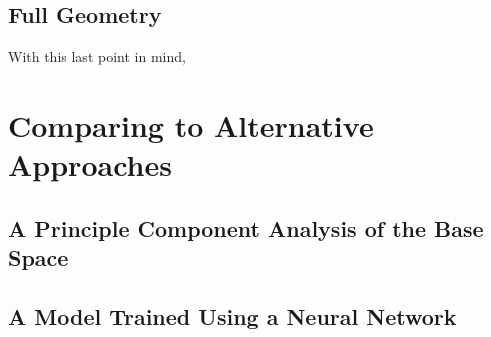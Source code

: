 \subsection{Full Geometry }

With this last point in mind, 

\section{Comparing to Alternative Approaches}

\subsection{A Principle Component Analysis of the Base Space}

\subsection{A Model Trained Using a Neural Network}
